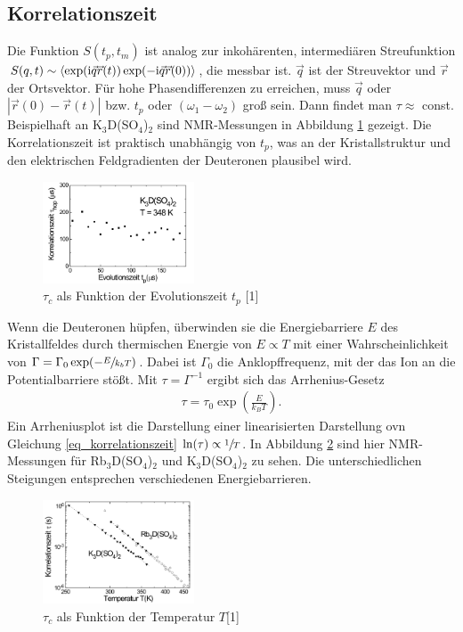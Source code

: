 \subsection{Korrelationszeit}
Die Funktion $S(t_p,t_m)$ ist analog zur inkohärenten, intermediären Streufunktion 
$S(q,t) \sim \langle\exp(\text{i}\vec q \vec r(t))\exp(-\text{i}\vec q \vec r(0))\rangle$, die messbar ist. $\vec q$ ist der Streuvektor und $\vec r$ der Ortsvektor. Für
hohe Phasendifferenzen zu erreichen, muss $\vec q$ oder $|\vec r(0)-\vec r(t)|$ bzw. $t_p$ oder $(\omega_1-\omega_2)$ groß sein. Dann findet man $\tau \approx$
const. Beispielhaft an K$_3$D(SO$_4$)$_2$ sind NMR-Messungen in Abbildung \ref{pic_tau(tp)} gezeigt. Die Korrelationszeit ist praktisch unabhängig von $t_p$,
was an der Kristallstruktur und den elektrischen Feldgradienten der Deuteronen plausibel wird.
\begin{figure}[H]
 \includegraphics[width=0.4\textwidth]{../pics/tau(tp).jpg}
 \caption{$\tau_c$ als Funktion der Evolutionszeit $t_p$ [1]}
 \label{pic_tau(tp)}
\end{figure}
\noindent
Wenn die Deuteronen hüpfen, überwinden sie die Energiebarriere $E$ des Kristallfeldes durch thermischen Energie von $E \propto T$ mit einer Wahrscheinlichkeit
von $\Gamma = \Gamma_0 \exp(-\sfrac{E}{k_bT})$. Dabei ist $\Gamma_0$ die Anklopffrequenz, mit der das Ion an die Potentialbarriere stößt. Mit 
$\tau = \Gamma^{-1}$ ergibt sich das Arrhenius-Gesetz
\begin{align}
 \tau = \tau_0 \exp \left(\frac{E}{k_BT}\right).
 \label{eq_korrelationszeit}
\end{align}
Ein Arrheniusplot ist die Darstellung einer linearisierten Darstellung ovn Gleichung \eqref{eq_korrelationszeit} $\ln(\tau) \propto \sfrac{1}{T}$.
In Abbildung \ref{pic_tau(T)} sind hier NMR-Messungen für Rb$_3$D(SO$_4$)$_2$ und K$_3$D(SO$_4$)$_2$ zu sehen. Die unterschiedlichen Steigungen entsprechen
verschiedenen Energiebarrieren.

\begin{figure}[H]
 \includegraphics[width=0.4\textwidth]{../pics/tau(T).jpg}
 \caption{$\tau_c$ als Funktion der Temperatur $T$[1]}
 \label{pic_tau(T)}
\end{figure}


